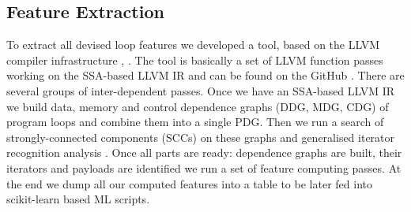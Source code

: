 \documentclass[sigconf,10pt,review,anonymous]{acmart}
\begin{document}
\subsection{Feature Extraction}
\label{feature_extraction}
\quad To extract all devised loop features we developed a tool, based on the LLVM compiler infrastructure \cite{Lattner:2004:LCF:977395.977673}, \cite{llvm-compiler-infrastructure}. The tool is basically a set of LLVM function passes working on the SSA-based LLVM IR and can be found on the GitHub \cite{github-ppar-tool}.\newline\null
\quad There are several groups of inter-dependent passes. Once we have an SSA-based LLVM IR we build data, memory and control dependence graphs (DDG, MDG, CDG) of program loops and combine them into a single PDG. Then we run a search of strongly-connected components (SCCs) on these graphs and generalised iterator recognition analysis \cite{Manilov:2018:GPI:3178372.3179511}. Once all parts are ready: dependence graphs are built, their iterators and payloads are identified we run a set of feature computing passes. At the end we dump all our computed features into a table to be later fed into scikit-learn based ML scripts.\newline\null
\end{document}
